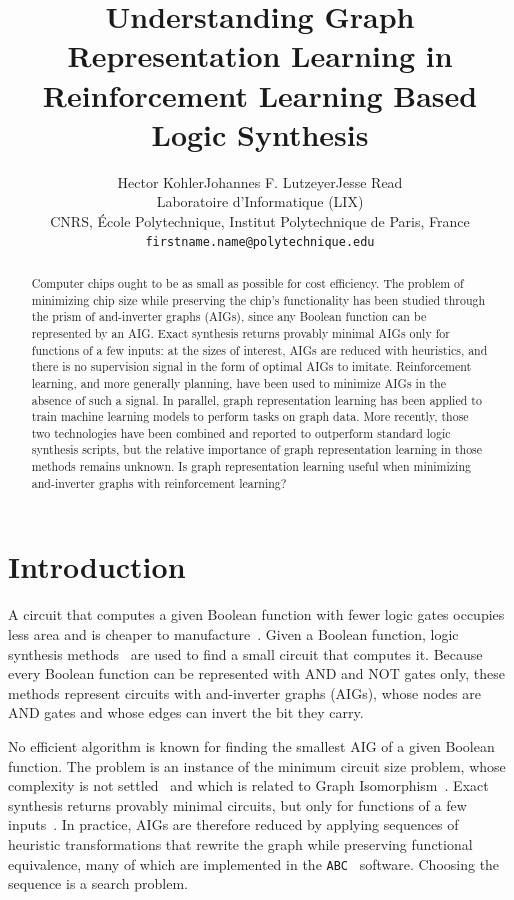 \documentclass{article}
\title{Understanding Graph Representation Learning in Reinforcement Learning Based Logic Synthesis}
\author{%
  Hector Kohler\And Johannes F. Lutzeyer\And Jesse Read\\
  Laboratoire d’Informatique (LIX)\\
  CNRS, École Polytechnique, Institut Polytechnique de Paris, France \\
  \texttt{firstname.name@polytechnique.edu} \\
}
\begin{document}
\maketitle


\begin{abstract}
Computer chips ought to be as small as possible for cost efficiency.
The problem of minimizing chip size while preserving the chip's functionality has been studied through the prism of and-inverter graphs (AIGs), since any Boolean function can be represented by an AIG.
Exact synthesis returns provably minimal AIGs only for functions of a few inputs: at the sizes of interest, AIGs are reduced with heuristics, and there is no supervision signal in the form of optimal AIGs to imitate.
Reinforcement learning, and more generally planning, have been used to minimize AIGs in the absence of such a signal.
In parallel, graph representation learning has been applied to train machine learning models to perform tasks on graph data.
More recently, those two technologies have been combined and reported to outperform standard logic synthesis scripts, but the relative importance of graph representation learning in those methods remains unknown.
Is graph representation learning useful when minimizing and-inverter graphs with reinforcement learning? 
\end{abstract}


\section{Introduction}
A circuit that computes a given Boolean function with fewer logic gates occupies less area and is cheaper to manufacture~\cite{randomized-transduction}.
Given a Boolean function, logic synthesis methods~\cite{rewriting,Mishchenko2006ScalableLS,resub} are used to find a small circuit that computes it.
Because every Boolean function can be represented with AND and NOT gates only, these methods represent circuits with and-inverter graphs (AIGs), whose nodes are AND gates and whose edges can invert the bit they carry.

No efficient algorithm is known for finding the smallest AIG of a given Boolean function.
The problem is an instance of the minimum circuit size problem, whose complexity is not settled~\cite{nphard,ilango2020} and which is related to Graph Isomorphism~\cite{graphiso}.
Exact synthesis returns provably minimal circuits, but only for functions of a few inputs~\cite{exact-synthesis}.
In practice, AIGs are therefore reduced by applying sequences of heuristic transformations that rewrite the graph while preserving functional equivalence, many of which are implemented in the \texttt{ABC}~\cite{abc} software.
Choosing the sequence is a search problem.
\end{document}
